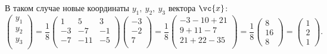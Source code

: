 В таком случае новые координаты $y_1, \ y_2, \ y_3$ вектора $\vc{x}$:
\begin{equation*}
    \begin{pmatrix}
        y_1 \\
        y_2 \\
        y_3 \\
    \end{pmatrix} = 
    \frac{1}{8} \begin{pmatrix}
        1 & 5 & 3 \\
        -3 & -7 & -1 \\
        -7 & -11 & -5 \\
    \end{pmatrix}
    \begin{pmatrix}
        -3 \\
        -2 \\
        7 \\
    \end{pmatrix} =
    \frac{1}{8} 
    \begin{pmatrix}
        -3-10+21 \\
        9+11 - 7 \\
        21 + 22 - 35 \\
    \end{pmatrix} = 
    \frac{1}{8} 
    \begin{pmatrix}
        8 \\
        16 \\
        8
    \end{pmatrix} =
    \begin{pmatrix}
        1 \\ 2 \\ 1
    \end{pmatrix}.
\end{equation*}
